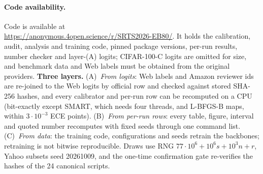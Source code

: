 \documentclass[sigconf,anonymous,review]{acmart}
\begin{document}
\paragraph{Code availability.} Code is available at\\
\url{https://anonymous.4open.science/r/SRTS2026-EB80/}.
It holds the calibration, audit, analysis and training code, pinned
package versions, per-run results, number checker and layer-(A) logits;
CIFAR-100-C logits are omitted for size, and benchmark data and Web labels
must be obtained from the original providers.
\textbf{Three layers.} (A)~\emph{From logits}: Web labels and Amazon reviewer ids are re-joined to the Web logits by
official row and checked against stored SHA-256 hashes, and every calibrator and
per-run row can be recomputed on a CPU (bit-exactly except SMART, which
needs four threads, and L-BFGS-B maps, within $3\cdot10^{-3}$ ECE points). (B)~\emph{From per-run rows}: every table, figure, interval and quoted
number recomputes with fixed seeds through one command list. (C)~\emph{From data}: the training code, configurations and seeds
retrain the backbones; retraining is not bitwise reproducible. Draws use RNG $77{\cdot}10^6+10^6s+10^3n+r$, Yahoo subsets seed 20261009, and the one-time confirmation gate re-verifies the hashes of the 24 canonical scripts.
\end{document}
